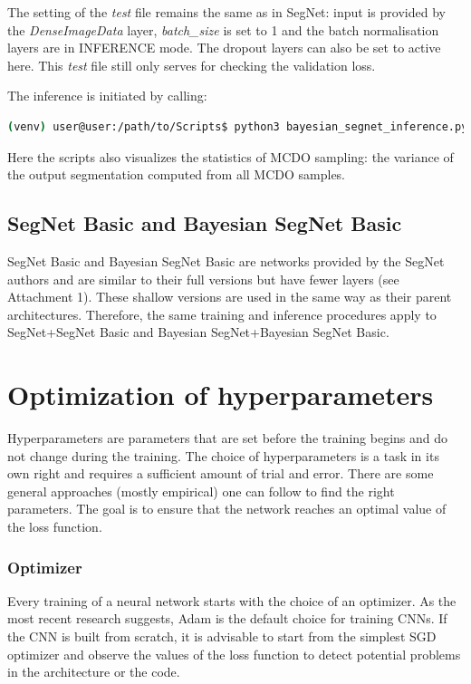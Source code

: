 \newpage
The setting of the \textit{test} file remains the same as in SegNet: input is provided by the \textit{DenseImageData} layer, \textit{batch\_size} is set to 1 and the batch normalisation layers are in INFERENCE mode. The dropout layers can also be set to active here. This \textit{test} file still only serves for checking the validation loss.

The inference is initiated by calling:

\begin{lstlisting}[language=bash]
(venv) user@user:/path/to/Scripts$ python3 bayesian_segnet_inference.py /path/to/inference.prototxt /path/to/final_weights.caffemodel /path/to/videofile.avi 
\end{lstlisting}

Here the scripts also visualizes the statistics of MCDO sampling: the variance of the output segmentation computed from all MCDO samples.

\subsection{SegNet Basic and Bayesian SegNet Basic}

SegNet Basic and Bayesian SegNet Basic are networks provided by the SegNet authors and are similar to their full versions but have fewer layers (see Attachment 1). These shallow versions are used in the same way as their parent architectures. Therefore, the same training and inference procedures apply to SegNet+SegNet Basic and Bayesian SegNet+Bayesian SegNet Basic.

\newpage
\section{Optimization of hyperparameters}

Hyperparameters are parameters that are set before the training begins and do not change during the training. The choice of hyperparameters is a task in its own right and requires a sufficient amount of trial and error. There are some general approaches (mostly empirical) one can follow to find the right parameters. The goal is to ensure that the network reaches an optimal value of the loss function. \cite{stanford-github}

\subsubsection{Optimizer}

Every training of a neural network starts with the choice of an optimizer. As the most recent research suggests, Adam is the default choice for training CNNs. If the CNN is built from scratch, it is advisable to start from the simplest SGD optimizer and observe the values of the loss function to detect potential problems in the architecture or the code. \cite{stanford-L7}


